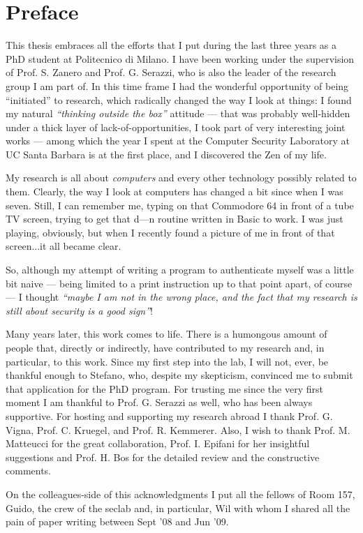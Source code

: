 
\section*{Preface}
This thesis embraces all the efforts that I put during the last three years as a PhD student at Politecnico di Milano. I have been working under the supervision of Prof. S. Zanero and Prof. G. Serazzi, who is also the leader of the research group I am part of. In this time frame I had the wonderful opportunity of being ``initiated'' to research, which radically changed the way I look at things: I found my natural \emph{``thinking outside the box''} attitude --- that was probably well-hidden under a thick layer of lack-of-opportunities, I took part of very interesting joint works --- among which the year I spent at the Computer Security Laboratory at UC Santa Barbara is at the first place, and I discovered the Zen of my life.

My research is all about \emph{computers} and every other technology possibly related to them. Clearly, the way I look at computers has changed a bit since when I was seven. Still, I can remember me, typing on that \textsf{Commodore} 64 in front of a tube TV screen, trying to get that d---n routine written in \textsf{Basic} to work. I was just playing, obviously, but when I recently found a picture of me in front of that screen...it all became clear.

So, although my attempt of writing a program to authenticate myself was a little bit naive --- being limited to a print instruction up to that point apart, of course --- I thought \emph{``maybe I am not in the wrong place, and the fact that my research is still about security is a good sign''}!

Many years later, this work comes to life. There is a humongous amount of people that, directly or indirectly, have contributed to my research and, in particular, to this work. Since my first step into the lab, I will not, ever, be thankful enough to Stefano, who, despite my skepticism, convinced me to submit that application for the PhD program. For trusting me since the very first moment I am thankful to Prof. G. Serazzi as well, who has been always supportive. For hosting and supporting my research abroad I thank Prof. G. Vigna, Prof. C. Kruegel, and Prof. R. Kemmerer. Also, I wish to thank Prof. M. Matteucci for the great collaboration, Prof. I. Epifani for her insightful suggestions and Prof. H. Bos for the detailed review and the constructive comments.

On the colleagues-side of this acknowledgments I put all the fellows of Room 157, Guido, the crew of the seclab and, in particular, Wil with whom I shared all the pain of paper writing between Sept '08 and Jun '09.

